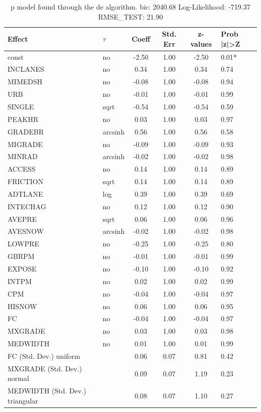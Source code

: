 \begin{table}
	\caption{p model found through the de algorithm. bic: 2040.68 Log-Likelihood: -719.37 RMSE_TEST: 21.90}
	\begin{center}
		\begin{tabular}{|l|l|c|c|c|l|}
			\hline
			Effect & $\tau$ & Coeff & Std. Err & z-values & Prob |z|>Z \\
			\hline
			const & no & -2.50 & 1.00 & -2.50 & 0.01* \\
			\hline
			INCLANES & no & 0.34 & 1.00 & 0.34 & 0.74 \\
			\hline
			MIMEDSH & no & -0.08 & 1.00 & -0.08 & 0.94 \\
			\hline
			URB & no & -0.01 & 1.00 & -0.01 & 0.99 \\
			\hline
			SINGLE & sqrt & -0.54 & 1.00 & -0.54 & 0.59 \\
			\hline
			PEAKHR & no & 0.03 & 1.00 & 0.03 & 0.97 \\
			\hline
			GRADEBR & arcsinh & 0.56 & 1.00 & 0.56 & 0.58 \\
			\hline
			MIGRADE & no & -0.09 & 1.00 & -0.09 & 0.93 \\
			\hline
			MINRAD & arcsinh & -0.02 & 1.00 & -0.02 & 0.98 \\
			\hline
			ACCESS & no & 0.14 & 1.00 & 0.14 & 0.89 \\
			\hline
			FRICTION & sqrt & 0.14 & 1.00 & 0.14 & 0.89 \\
			\hline
			ADTLANE & log & 0.39 & 1.00 & 0.39 & 0.69 \\
			\hline
			INTECHAG & no & 0.12 & 1.00 & 0.12 & 0.90 \\
			\hline
			AVEPRE & sqrt & 0.06 & 1.00 & 0.06 & 0.96 \\
			\hline
			AVESNOW & arcsinh & -0.02 & 1.00 & -0.02 & 0.98 \\
			\hline
			LOWPRE & no & -0.25 & 1.00 & -0.25 & 0.80 \\
			\hline
			GBRPM & no & -0.01 & 1.00 & -0.01 & 0.99 \\
			\hline
			EXPOSE & no & -0.10 & 1.00 & -0.10 & 0.92 \\
			\hline
			INTPM & no & 0.02 & 1.00 & 0.02 & 0.99 \\
			\hline
			CPM & no & -0.04 & 1.00 & -0.04 & 0.97 \\
			\hline
			HISNOW & no & 0.06 & 1.00 & 0.06 & 0.95 \\
			\hline
			FC & no & -0.04 & 1.00 & -0.04 & 0.97 \\
			\hline
			MXGRADE & no & 0.03 & 1.00 & 0.03 & 0.98 \\
			\hline
			MEDWIDTH & no & 0.01 & 1.00 & 0.01 & 0.99 \\
			\hline
			FC (Std. Dev.) uniform &  & 0.06 & 0.07 & 0.81 & 0.42 \\
			\hline
			MXGRADE (Std. Dev.) normal &  & 0.09 & 0.07 & 1.19 & 0.23 \\
			\hline
			MEDWIDTH (Std. Dev.) triangular &  & 0.08 & 0.07 & 1.10 & 0.27 \\
			\hline
		\end{tabular}
	\end{center}
\end{table}